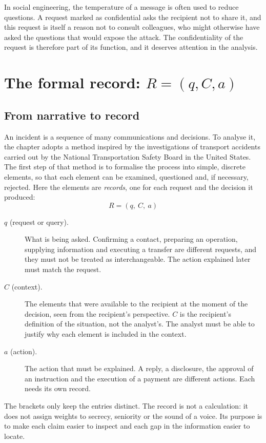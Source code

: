 In social engineering, the temperature of a message is often used to reduce questions. A request marked as confidential asks the recipient not to share it, and this request is itself a reason not to consult colleagues, who might otherwise have asked the questions that would expose the attack. The confidentiality of the request is therefore part of its function, and it deserves attention in the analysis.

\section{The formal record: $R = (q, C, a)$}

\subsection{From narrative to record}
An incident is a sequence of many communications and decisions. To analyse it, the chapter adopts a method inspired by the investigations of transport accidents carried out by the National Transportation Safety Board in the United States. The first step of that method is to formalise the process into simple, discrete elements, so that each element can be examined, questioned and, if necessary, rejected. Here the elements are \emph{records}, one for each request and the decision it produced:
\[
R = (q,\ C,\ a)
\]

\begin{description}
	\item[$q$ (request or query).] What is being asked. Confirming a contact, preparing an operation, supplying information and executing a transfer are different requests, and they must not be treated as interchangeable. The action explained later must match the request.
	\item[$C$ (context).] The elements that were available to the recipient at the moment of the decision, seen from the recipient's perspective. $C$ is the recipient's definition of the situation, not the analyst's. The analyst must be able to justify why each element is included in the context.
	\item[$a$ (action).] The action that must be explained. A reply, a disclosure, the approval of an instruction and the execution of a payment are different actions. Each needs its own record.
\end{description}

The brackets only keep the entries distinct. The record is not a calculation: it does not assign weights to secrecy, seniority or the sound of a voice. Its purpose is to make each claim easier to inspect and each gap in the information easier to locate.


